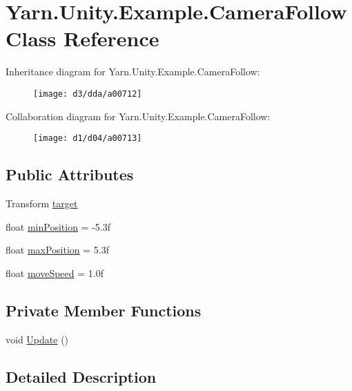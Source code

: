 \hypertarget{a00025}{\section{Yarn.\-Unity.\-Example.\-Camera\-Follow Class Reference}
\label{a00025}
}


Inheritance diagram for Yarn.\-Unity.\-Example.\-Camera\-Follow\-:
\nopagebreak
\begin{figure}[H]
\begin{center}
\leavevmode
\texttt{[image: d3/dda/a00712]}
\end{center}
\end{figure}


Collaboration diagram for Yarn.\-Unity.\-Example.\-Camera\-Follow\-:
\nopagebreak
\begin{figure}[H]
\begin{center}
\leavevmode
\texttt{[image: d1/d04/a00713]}
\end{center}
\end{figure}
\subsection*{Public Attributes}
\begin{DoxyCompactItemize}
\item 
Transform \hyperlink{a00025_aa5d6958fb14a14ebb74e21c372fcca8b}{target}
\item 
float \hyperlink{a00025_a08c6f6c0ea423c21af99e4b5467d3c9b}{min\-Position} = -\/5.\-3f
\item 
float \hyperlink{a00025_abb0154dcbc2a7d43795beacd61a56de4}{max\-Position} = 5.\-3f
\item 
float \hyperlink{a00025_a3d4f2efe9c2cee8c7ff797cac03f27ec}{move\-Speed} = 1.\-0f
\end{DoxyCompactItemize}
\subsection*{Private Member Functions}
\begin{DoxyCompactItemize}
\item 
void \hyperlink{a00025_a592ddbf8e493bde0a6536c0234869217}{Update} ()
\end{DoxyCompactItemize}


\subsection{Detailed Description}


